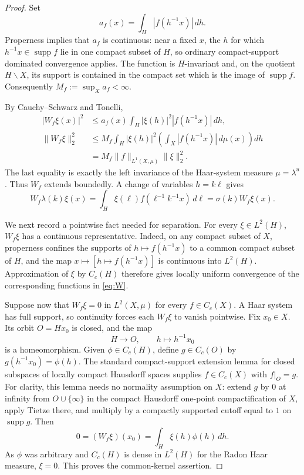 \documentclass[11pt]{article}
\theoremstyle{remark}
\newcommand{\supp}{\operatorname{supp}}
\begin{document}
\begin{proof}
Set
\[
     a_f(x)=\int_H |f(h^{-1}x)|\,dh.
\]
Properness implies that $a_f$ is continuous: near a fixed $x$, the $h$ for
which $h^{-1}x\in\supp f$ lie in one compact subset of $H$, so ordinary
compact-support dominated convergence applies.  The function is
$H$-invariant and, on the quotient $H\backslash X$, its support is contained
in the compact set which is the image of $\supp f$. Consequently
$M_f:=\sup_X a_f<\infty$.

By Cauchy--Schwarz and Tonelli,
\begin{align*}
 |W_f\xi(x)|^2
 &\le a_f(x)\int_H |\xi(h)|^2|f(h^{-1}x)|\,dh,\\
 \|W_f\xi\|_2^2
 &\le M_f\int_H |\xi(h)|^2
       \left(\int_X|f(h^{-1}x)|\,d\mu(x)\right)dh\\
 &=M_f\|f\|_{L^1(X,\mu)}\|\xi\|_2^2.
\end{align*}
The last equality is exactly the left invariance of the Haar-system measure
$\mu=\lambda^u$. Thus $W_f$ extends boundedly. A change of variables
$h=k\ell$ gives
\[
 W_f\lambda(k)\xi(x)
 =\int_H\xi(\ell)f(\ell^{-1}k^{-1}x)\,d\ell
 =\sigma(k)W_f\xi(x).
\]

We next record a pointwise fact needed for separation. For every
$\xi\in L^2(H)$, $W_f\xi$ has a continuous representative. Indeed, on any
compact subset of $X$, properness confines the supports of
$h\mapsto f(h^{-1}x)$ to a common compact subset of $H$, and the map
$x\mapsto[h\mapsto f(h^{-1}x)]$ is continuous into $L^2(H)$. Approximation of
$\xi$ by $C_c(H)$ therefore gives locally uniform convergence of the
corresponding functions in \eqref{eq:W}.

Suppose now that $W_f\xi=0$ in $L^2(X,\mu)$ for every $f\in C_c(X)$.  A Haar
system has full support, so continuity forces each $W_f\xi$ to vanish
pointwise. Fix $x_0\in X$. Its orbit $O=Hx_0$ is closed, and the map
\[
       H\longrightarrow O,\qquad h\longmapsto h^{-1}x_0
\]
is a homeomorphism. Given $\phi\in C_c(H)$, define $g\in C_c(O)$ by
$g(h^{-1}x_0)=\phi(h)$. The standard compact-support extension lemma for
closed subspaces of locally compact Hausdorff spaces supplies
$f\in C_c(X)$ with $f|_O=g$.  For clarity, this lemma needs no normality
assumption on $X$: extend $g$ by $0$ at infinity from $O\cup\{\infty\}$ in
the compact Hausdorff one-point compactification of $X$, apply Tietze there,
and multiply by a compactly supported cutoff equal to $1$ on $\supp g$.
Then
\[
       0=(W_f\xi)(x_0)=\int_H\xi(h)\phi(h)\,dh.
\]
As $\phi$ was arbitrary and $C_c(H)$ is dense in $L^2(H)$ for the Radon Haar
measure, $\xi=0$. This proves the common-kernel assertion.
\end{proof}
\end{document}
